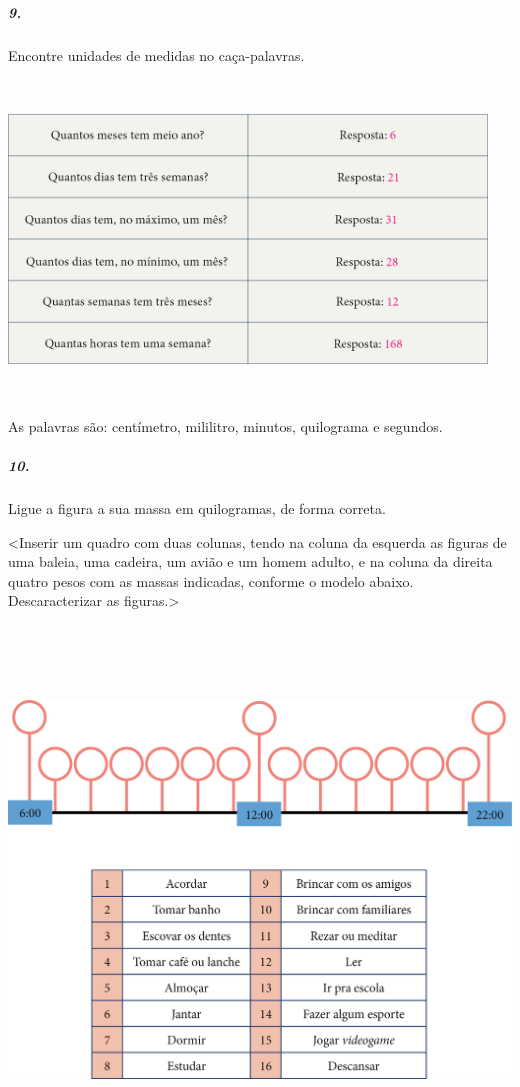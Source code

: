 \subparagraph{9.}\label{section-36}

Encontre unidades de medidas no caça-palavras.

\includegraphics[width=5.00000in,height=3.32292in]{media/image50.png}

As palavras são: centímetro, mililitro, minutos, quilograma e segundos.

\subparagraph{10.}\label{section-37}

Ligue a figura a sua massa em quilogramas, de forma correta.

\textless{}Inserir um quadro com duas colunas, tendo na coluna da
esquerda as figuras de uma baleia, uma cadeira, um avião e um homem
adulto, e na coluna da direita quatro pesos com as massas indicadas,
conforme o modelo abaixo. Descaracterizar as figuras.\textgreater{}

\includegraphics[width=5.28125in,height=5.51714in]{media/image51.png}

